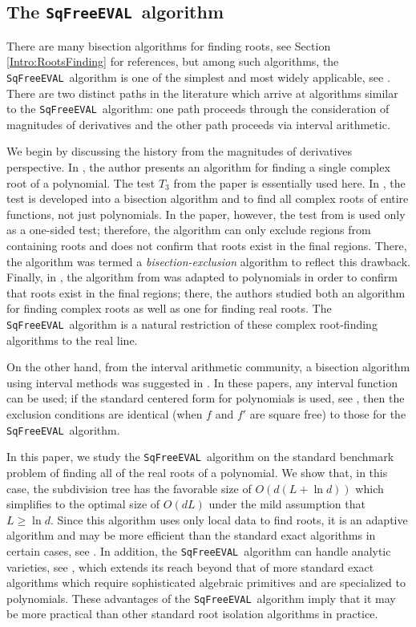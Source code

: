 \documentclass{amsart}
\theoremstyle{definition}
\newcommand{\EVAL}{\texttt{SqFreeEVAL}}
\begin{document}
\subsection{The \EVAL\ algorithm}
There are many bisection algorithms for finding roots, see Section \ref{Intro:RootsFinding} for references, but among such algorithms, the \EVAL\ algorithm is one of the simplest and most widely applicable, see \citep{burr-sharma-yap:eval:09}.  There are two distinct paths in the literature which arrive at algorithms similar to the \EVAL\ algorithm: one path proceeds through the consideration of magnitudes of derivatives and the other path proceeds via interval arithmetic.

We begin by discussing the history from the magnitudes of derivatives perspective.  In \citep{Henrici:search:70}, the author presents an algorithm for finding a single complex root of a polynomial.  The test $T_3$ from the paper is essentially used here.  In \citep{Yakoubsohn:bisection:05}, the test is developed into a bisection algorithm and to find all complex roots of entire functions, not just polynomials.  In the paper, however, the test from \citep{Henrici:search:70} is used only as a one-sided test; therefore, the algorithm can only exclude regions from containing roots and does not confirm that roots exist in the final regions.  There, the algorithm was termed a {\em bisection-exclusion} algorithm to reflect this drawback.  Finally, in \citep{sagraloff-yap:ceval:09}, the algorithm from \citep{Yakoubsohn:bisection:05} was adapted to polynomials in order to confirm that roots exist in the final regions; there, the authors studied both an algorithm for finding complex roots as well as one for finding real roots.  The \EVAL\ algorithm is a natural restriction of these complex root-finding algorithms to the real line.

On the other hand, from the interval arithmetic community, a bisection algorithm using interval methods was suggested in \citep{moore:bk,mitchell:robust-ray:90}.  In these papers, any interval function can be used; if the standard centered form for polynomials is used, see \citep{ratschek-rokne:range:bk}, then the exclusion conditions are identical (when $f$ and $f'$ are square free) to those for the \EVAL\ algorithm.

In this paper, we study the \EVAL\ algorithm on the standard benchmark problem of finding all of the real roots of a polynomial.  We show that, in this case, the subdivision tree has the favorable size of $O(d(L+\ln d))$ which simplifies to the optimal size of $O(dL)$ under the mild assumption that $L\geq\ln d$.  Since this algorithm uses only local data to find roots, it is an adaptive algorithm and may be more efficient than the standard exact algorithms in certain cases, see \citep{burr-sharma-yap:eval:09}.  In addition, the \EVAL\ algorithm can handle analytic varieties, see \citep{burr-sharma-yap:eval:09}, which extends its reach beyond that of more standard exact algorithms which require sophisticated algebraic primitives and are specialized to polynomials.  These advantages of the \EVAL\ algorithm imply that it may be more practical than other standard root isolation algorithms in practice.
\end{document}
